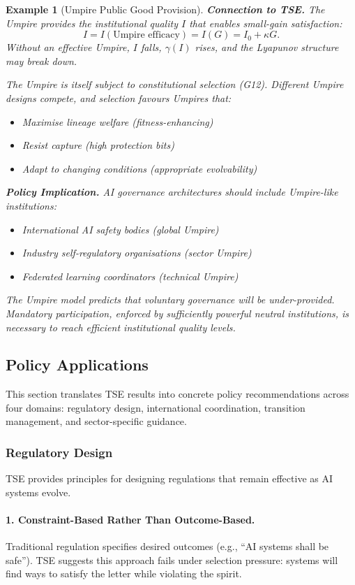 \documentclass[12pt]{article}
\newtheorem{example}[theorem]{Example}
\begin{document}
\begin{example}[Umpire Public Good Provision]
\textbf{Connection to TSE.}
The Umpire provides the institutional quality $I$ that enables small-gain satisfaction:
\[
I = I(\text{Umpire efficacy}) = I(G) = I_0 + \kappa G.
\]
Without an effective Umpire, $I$ falls, $\gamma(I)$ rises, and the Lyapunov structure may break down.

The Umpire is itself subject to constitutional selection (G12). Different Umpire designs compete, and selection favours Umpires that:
\begin{itemize}
    \item Maximise lineage welfare (fitness-enhancing)
    \item Resist capture (high protection bits)
    \item Adapt to changing conditions (appropriate evolvability)
\end{itemize}

\textbf{Policy Implication.}
AI governance architectures should include Umpire-like institutions:
\begin{itemize}
    \item International AI safety bodies (global Umpire)
    \item Industry self-regulatory organisations (sector Umpire)
    \item Federated learning coordinators (technical Umpire)
\end{itemize}

The Umpire model predicts that voluntary governance will be under-provided. Mandatory participation, enforced by sufficiently powerful neutral institutions, is necessary to reach efficient institutional quality levels.
\end{example}

\subsection{Policy Applications}

This section translates TSE results into concrete policy recommendations across four domains: regulatory design, international coordination, transition management, and sector-specific guidance.

\subsubsection{Regulatory Design}

TSE provides principles for designing regulations that remain effective as AI systems evolve.

\paragraph{1. Constraint-Based Rather Than Outcome-Based.}
Traditional regulation specifies desired outcomes (e.g., ``AI systems shall be safe''). TSE suggests this approach fails under selection pressure: systems will find ways to satisfy the letter while violating the spirit.
\end{document}
